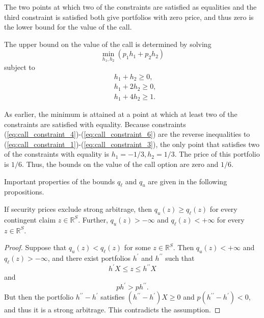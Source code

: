 \documentclass[\topdir/lecture\_notes.tex]{subfiles}
\begin{document}
\begin{optional}
\begin{example}
The two points at which two of the constraints are satisfied as equalities and the third constraint is satisfied both give portfolios with zero price, and thus zero is the lower bound for the value of the call.

The upper bound on the value of the call is determined by solving
\begin{equation*}
\min _{h_{1}, h_{2}}\left(p_{1} h_{1}+p_{2} h_{2}\right) 
\end{equation*}
subject to
\begin{align}
& h_{1}+h_{2} \geq 0, \label{eq:call_constraint_4}\\
& h_{1}+2 h_{2} \geq 0, \label{eq:call_constraint_5}\\
& h_{1}+4 h_{2} \geq 1 . \label{eq:call_constraint_6}
\end{align}

As earlier, the minimum is attained at a point at which at least two of the constraints are satisfied with equality. Because constraints (\ref{eq:call_constraint_4})-(\ref{eq:call_constraint_6}) are the reverse inequalities to (\ref{eq:call_constraint_1})-(\ref{eq:call_constraint_3}), the only point that satisfies two of the constraints with equality is \(h_{1}=-1 / 3, h_{2}=1 / 3\). The price of this portfolio is \(1 / 6\). Thus, the bounds on the value of the call option are zero and \(1 / 6\).
\end{example}
Important properties of the bounds \(q_{\ell}\) and \(q_{u}\) are given in the following propositions.

\begin{proposition} \label{prop:bounds_ordering}
If security prices exclude strong arbitrage, then \(q_{u}(z) \geq q_{\ell}(z)\) for every contingent claim \(z \in \mathbb{R}^{S}\). Further, \(q_{u}(z)>-\infty\) and \(q_{\ell}(z)<+\infty\) for every \(z \in \mathbb{R}^{S}\).
\end{proposition}
\begin{proof}
Suppose that \(q_{u}(z)<q_{\ell}(z)\) for some \(z \in \mathbb{R}^{S}\). Then \(q_{u}(z)<+\infty\) and \(q_{\ell}(z)>-\infty\), and there exist portfolios \(h^{\prime}\) and \(h^{\prime \prime}\) such that
\begin{equation*}
h^{\prime} X \leq z \leq h^{\prime \prime} X 
\end{equation*}
and
\begin{equation*}
p h^{\prime}>p h^{\prime \prime} . 
\end{equation*}
But then the portfolio \(h^{\prime \prime}-h^{\prime}\) satisfies \(\left(h^{\prime \prime}-h^{\prime}\right) X \geq 0\) and \(p\left(h^{\prime \prime}-h^{\prime}\right)<0\), and thus it is a strong arbitrage. This contradicts the assumption.


\end{proof}
\end{optional}
\end{document}

